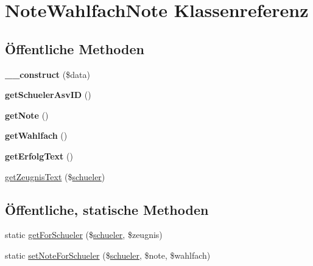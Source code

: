 \hypertarget{class_note_wahlfach_note}{}\section{Note\+Wahlfach\+Note Klassenreferenz}
\label{class_note_wahlfach_note}
\subsection*{Öffentliche Methoden}
\begin{DoxyCompactItemize}
\item 
\mbox{\label{class_note_wahlfach_note_aab11ec92980054a738e38b80a54bf248}} 
{\bfseries \+\_\+\+\_\+construct} (\$data)
\item 
\mbox{\label{class_note_wahlfach_note_a4bbc9458accd32f3d921ad751875631c}} 
{\bfseries get\+Schueler\+Asv\+ID} ()
\item 
\mbox{\label{class_note_wahlfach_note_afd29e1e3a2ff452e8596634f78088507}} 
{\bfseries get\+Note} ()
\item 
\mbox{\label{class_note_wahlfach_note_ae8f558e9302c0931a7a82b4be6893a45}} 
{\bfseries get\+Wahlfach} ()
\item 
\mbox{\label{class_note_wahlfach_note_a4dc5984c456755a899bb9dca2937674a}} 
{\bfseries get\+Erfolg\+Text} ()
\item 
\mbox{\hyperlink{class_note_wahlfach_note_af6c547d2b191111ea92879c6b06db083}{get\+Zeugnis\+Text}} (\$\mbox{\hyperlink{classschueler}{schueler}})
\end{DoxyCompactItemize}
\subsection*{Öffentliche, statische Methoden}
\begin{DoxyCompactItemize}
\item 
static \mbox{\hyperlink{class_note_wahlfach_note_ad2dadcb48c337d004a6b1d8957ff950b}{get\+For\+Schueler}} (\$\mbox{\hyperlink{classschueler}{schueler}}, \$zeugnis)
\item 
static \mbox{\hyperlink{class_note_wahlfach_note_a035492519844d37715306a494b6b573b}{set\+Note\+For\+Schueler}} (\$\mbox{\hyperlink{classschueler}{schueler}}, \$note, \$wahlfach)
\end{DoxyCompactItemize}


